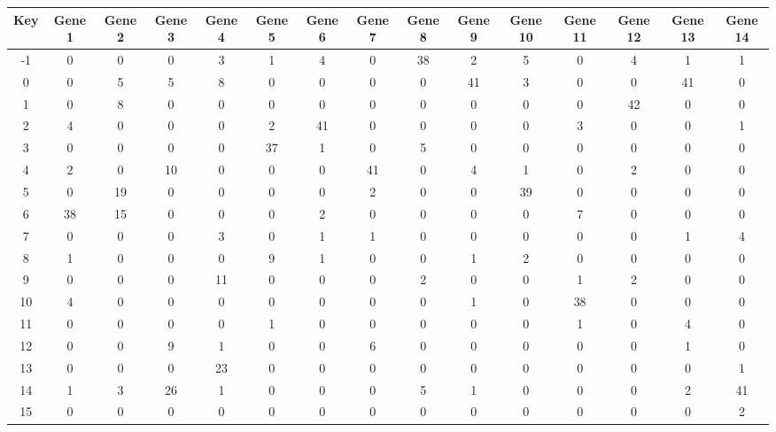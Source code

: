 \begin{tabular}{|c|c|c|c|c|c|c|c|c|c|c|c|c|c|c|}
\hline
Key & Gene 1 & Gene 2 & Gene 3 & Gene 4 & Gene 5 & Gene 6 & Gene 7 & Gene 8 & Gene 9 & Gene 10 & Gene 11 & Gene 12 & Gene 13 & Gene 14 \\
\hline
-1 & 0 & 0 & 0 & 3 & 1 & 4 & 0 & 38 & 2 & 5 & 0 & 4 & 1 & 1 \\
0 & 0 & 5 & 5 & 8 & 0 & 0 & 0 & 0 & 41 & 3 & 0 & 0 & 41 & 0 \\
1 & 0 & 8 & 0 & 0 & 0 & 0 & 0 & 0 & 0 & 0 & 0 & 42 & 0 & 0 \\
2 & 4 & 0 & 0 & 0 & 2 & 41 & 0 & 0 & 0 & 0 & 3 & 0 & 0 & 1 \\
3 & 0 & 0 & 0 & 0 & 37 & 1 & 0 & 5 & 0 & 0 & 0 & 0 & 0 & 0 \\
4 & 2 & 0 & 10 & 0 & 0 & 0 & 41 & 0 & 4 & 1 & 0 & 2 & 0 & 0 \\
5 & 0 & 19 & 0 & 0 & 0 & 0 & 2 & 0 & 0 & 39 & 0 & 0 & 0 & 0 \\
6 & 38 & 15 & 0 & 0 & 0 & 2 & 0 & 0 & 0 & 0 & 7 & 0 & 0 & 0 \\
7 & 0 & 0 & 0 & 3 & 0 & 1 & 1 & 0 & 0 & 0 & 0 & 0 & 1 & 4 \\
8 & 1 & 0 & 0 & 0 & 9 & 1 & 0 & 0 & 1 & 2 & 0 & 0 & 0 & 0 \\
9 & 0 & 0 & 0 & 11 & 0 & 0 & 0 & 2 & 0 & 0 & 1 & 2 & 0 & 0 \\
10 & 4 & 0 & 0 & 0 & 0 & 0 & 0 & 0 & 1 & 0 & 38 & 0 & 0 & 0 \\
11 & 0 & 0 & 0 & 0 & 1 & 0 & 0 & 0 & 0 & 0 & 1 & 0 & 4 & 0 \\
12 & 0 & 0 & 9 & 1 & 0 & 0 & 6 & 0 & 0 & 0 & 0 & 0 & 1 & 0 \\
13 & 0 & 0 & 0 & 23 & 0 & 0 & 0 & 0 & 0 & 0 & 0 & 0 & 0 & 1 \\
14 & 1 & 3 & 26 & 1 & 0 & 0 & 0 & 5 & 1 & 0 & 0 & 0 & 2 & 41 \\
15 & 0 & 0 & 0 & 0 & 0 & 0 & 0 & 0 & 0 & 0 & 0 & 0 & 0 & 2 \\
\hline
\end{tabular}